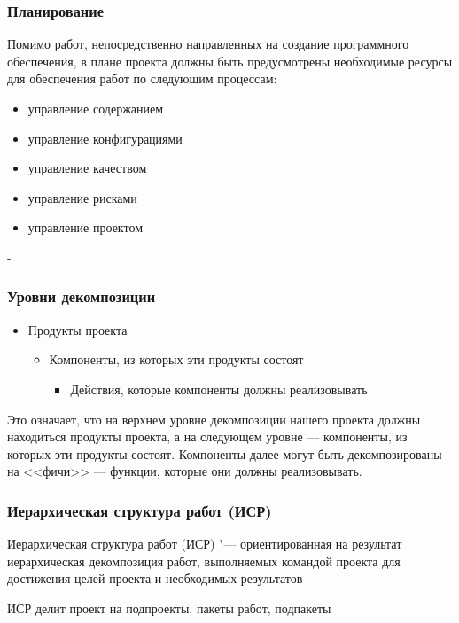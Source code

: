 \documentclass{../industrial-development}
\begin{document}
    \begin{frame} \frametitle{Планирование}
        Помимо работ, непосредственно направленных на создание программного обеспечения, в плане проекта должны быть предусмотрены необходимые ресурсы для обеспечения работ по следующим процессам:
	\begin{itemize}
		\item управление содержанием
		\item управление конфигурациями
        \item управление качеством
        \item управление рисками
        \item управление проектом
	\end{itemize}
    \end{frame}
    \lecturenotes
    -

    \begin{frame} \frametitle{Уровни декомпозиции}
        \begin{itemize}
            \item Продукты проекта
            \begin{itemize}
                \item Компоненты, из которых эти продукты состоят
                \begin{itemize}
                    \item Действия, которые компоненты должны реализовывать
                \end{itemize}
            \end{itemize}
        \end{itemize}
    \end{frame}
    \lecturenotes
    
    Это означает, что на верхнем уровне декомпозиции нашего проекта должны находиться продукты проекта, а на следующем уровне — компоненты, из которых эти продукты состоят. Компоненты далее могут быть декомпозированы на <<фичи>> — функции, которые они должны реализовывать.

    \begin{frame} \frametitle{Иерархическая структура работ (ИСР)}
        \begin{definition}
            \alert{Иерархическая структура работ (ИСР)} "--- ориентированная на результат иерархическая декомпозиция работ, выполняемых командой проекта для достижения целей проекта и необходимых результатов
        \end{definition}
    
        ИСР делит проект на подпроекты, пакеты работ, подпакеты
        \end{frame}
        \lecturenotes
    
\end{document}
